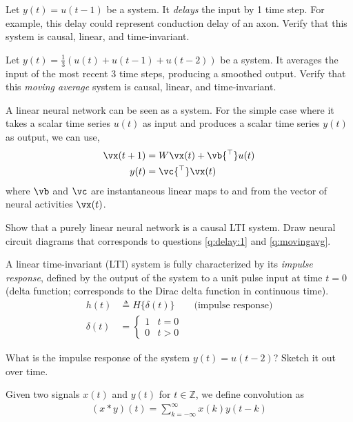 \documentclass[a4paper,11pt]{exam}
\newcounter{ct}
\newcommand{\trp}{{^\top}} %
\newcommand{\field}[1]{\ensuremath{\mathbb{#1}}}
\newcommand{\integers}{\field{Z}}
\begin{document}
\begin{questions}
\question \label{q:delay:1}
Let $y(t) = u(t-1)$ be a system.
It \emph{delays} the input by 1 time step.
For example, this delay could represent conduction delay of an axon.
Verify that this system is causal, linear, and time-invariant.

\question \label{q:movingavg}
Let $y(t) = \frac{1}{3}\left( u(t) + u(t-1) + u(t-2) \right)$ be a system.
It averages the input of the most recent 3 time steps, producing a smoothed output.
Verify that this \emph{moving average} system is causal, linear, and time-invariant.

\clearpage
A linear neural network can be seen as a system.
For the simple case where it takes a scalar time series $u(t)$ as input and produces a scalar time series $y(t)$ as output, we can use,
\begin{align}\label{eq:dtlds:lti:1}
    \vx(t+1) &= W \vx(t) + \vb\trp u(t)
    \\
    y(t) &= \vc\trp \vx(t)
\end{align}
where $\vb$ and $\vc$ are instantaneous linear maps to and from the vector of neural activities $\vx(t)$.

\question Show that a purely linear neural network is a causal LTI system.
Draw neural circuit diagrams that corresponds to questions \ref{q:delay:1} and \ref{q:movingavg}.

\begin{tcolorbox}
A linear time-invariant (LTI) system is fully characterized by its \emph{impulse response}, defined by the output of the system to a unit pulse input at time $t = 0$ (delta function; corresponds to the Dirac delta function in continuous time).
\begin{align}
    h(t) &\triangleq H\{ \delta(t) \} \qquad \text{(impulse response)}
    \\
    \delta(t) &= 
	\begin{cases}
	1 & t = 0\\
	0 & t > 0
	\end{cases}
\end{align}
\end{tcolorbox}

\question What is the impulse response of the system $y(t) = u(t-2)$? Sketch it out over time.

\begin{tcolorbox}[colback=black!1!,title=Convolution]
    Given two signals $x(t)$ and $y(t)$ for $t \in \integers$, we define convolution as
\begin{align}\label{eq:convolution}
    (x \ast y)(t) = \sum_{k=-\infty}^\infty x(k) y(t-k)
\end{align}
\end{tcolorbox}


\end{questions}
\end{document}
